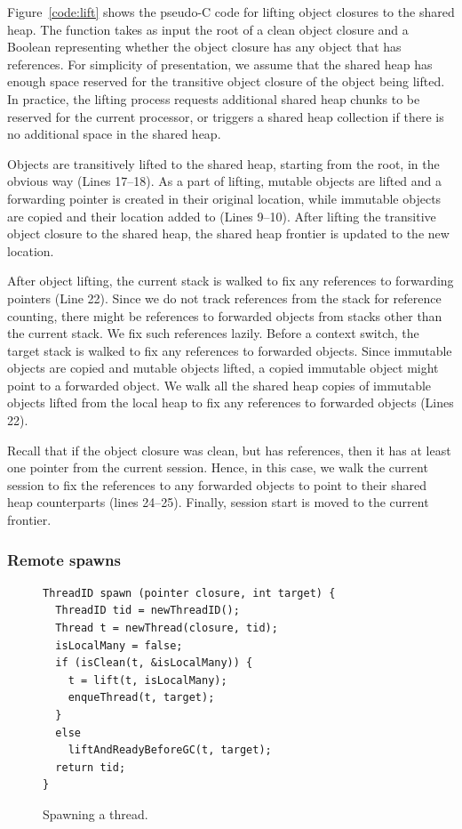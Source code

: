 Figure~\ref{code:lift} shows the pseudo-C code for lifting object closures to
the shared heap. The function  takes as input the root of a clean
object closure and a Boolean representing whether the object closure has any
object that has  references. For simplicity of presentation, we
assume that the shared heap has enough space reserved for the transitive object
closure of the object being lifted. In practice, the lifting process requests
additional shared heap chunks to be reserved for the current processor, or
triggers a shared heap collection if there is no additional space in the shared
heap.

Objects are transitively lifted to the shared heap, starting from the root, in
the obvious way (Lines 17--18). As a part of lifting, mutable objects are
lifted and a forwarding pointer is created in their original location, while
immutable objects are copied and their location added to  (Lines
9--10). After lifting the transitive object closure to the shared heap, the
shared heap frontier is updated to the new location.

After object lifting, the current stack is walked to fix any references to
forwarding pointers (Line 22). Since we do not track references from the stack
for reference counting, there might be references to forwarded objects from
stacks other than the current stack. We fix such references lazily. Before a
context switch, the target stack is walked to fix any references to forwarded
objects. Since immutable objects are copied and mutable objects lifted, a
copied immutable object might point to a forwarded object. We walk all the
shared heap copies of immutable objects lifted from the local heap to fix any
references to forwarded objects (Lines 22).

Recall that if the object closure was clean, but has 
references, then it has at least one pointer from the current session. Hence,
in this case, we walk the current session to fix the references to any
forwarded objects to point to their shared heap counterparts (lines 24--25).
Finally, session start is moved to the current frontier.

\subsubsection{Remote spawns}
\label{sec:remote_spawns}

\begin{figure}
\begin{lstlisting}
ThreadID spawn (pointer closure, int target) {
  ThreadID tid = newThreadID();
  Thread t = newThread(closure, tid);
  isLocalMany = false;
  if (isClean(t, &isLocalMany)) {
    t = lift(t, isLocalMany);
    enqueThread(t, target);
  }
  else
    liftAndReadyBeforeGC(t, target);
  return tid;
}
\end{lstlisting}
\caption{Spawning a thread.}
\label{code:spawn}
\end{figure}

